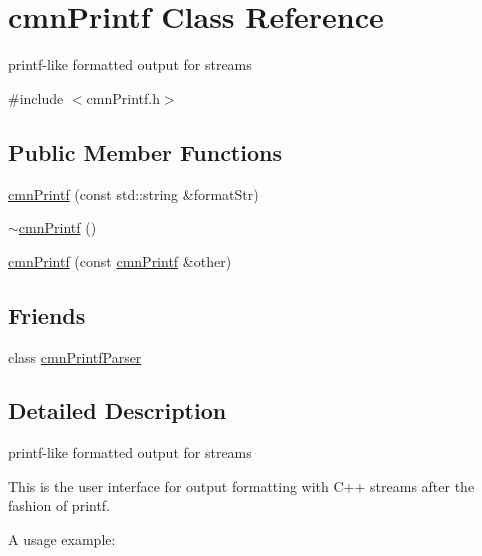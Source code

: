 \hypertarget{classcmn_printf}{\section{cmn\-Printf Class Reference}
\label{classcmn_printf}
}


printf-\/like formatted output for streams  




{\ttfamily \#include $<$cmn\-Printf.\-h$>$}

\subsection*{Public Member Functions}
\begin{DoxyCompactItemize}
\item 
\hyperlink{classcmn_printf_af834e91520896f203bf74171a852e38f}{cmn\-Printf} (const std\-::string \&format\-Str)
\item 
\hyperlink{classcmn_printf_a90b02799c58a696eeef7e3ecc2772834}{$\sim$cmn\-Printf} ()
\item 
\hyperlink{classcmn_printf_a22f12554c865b206fb5cac761a3cd0db}{cmn\-Printf} (const \hyperlink{classcmn_printf}{cmn\-Printf} \&other)
\end{DoxyCompactItemize}
\subsection*{Friends}
\begin{DoxyCompactItemize}
\item 
class \hyperlink{classcmn_printf_a73ad898e5a1725bb1c99d1bccadf68b2}{cmn\-Printf\-Parser}
\end{DoxyCompactItemize}


\subsection{Detailed Description}
printf-\/like formatted output for streams 

This is the user interface for output formatting with C++ streams after the fashion of printf.

A usage example\-:





